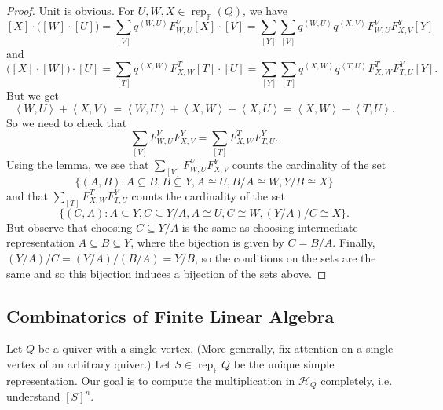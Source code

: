 \documentclass{book}
\DeclareMathOperator{\rep}{rep}
\begin{document}
    \begin{proof}
        Unit is obvious. For $U,W,X\in\rep_\mathbb{F}(Q)$, we have 
        \[[X]\cdot\Big([W]\cdot[U]\Big)=\sum_{[V]}q^{\left<W,U\right>}F_{W,U}^V[X]\cdot[V]=\sum_{[Y]}\sum_{[V]}q^{\left<W,U\right>}q^{\left<X,V\right>}F_{W,U}^VF_{X,V}^Y[Y]\]
        and
        \[ \Big([X]\cdot[W]\Big)\cdot[U] = \sum_{[T]}q^{\left<X,W\right>}F_{X,W}^T[T]\cdot[U] = \sum_{[Y]}\sum_{[T]}q^{\left<X,W\right>}q^{\left<T,U\right>}F_{X,W}^T F_{T,U}^Y[Y].\]
        But we get \[ \left<W,U\right>+\left<X,V\right> = \left<W,U\right>+\left<X,W\right>+\left<X,U\right> = \left<X,W\right>+\left<T,U\right>.\]
        So we need to check that \[\sum_{[V]}F_{W,U}^V F_{X,V}^Y=\sum_{[T]}F_{X,W}^T F_{T,U}^Y.\]
        Using the lemma, we see that $\sum_{[V]}F_{W,U}^V F_{X,V}^Y$ counts the cardinality of the set 
        \[\{(A,B): A\subseteq B, B\subseteq Y, A\cong U, B/A\cong W, Y/B\cong X\}\]
        and that $\sum_{[T]}F_{X,W}^T F_{T,U}^Y$ counts the cardinality of the set 
         \[\{(C,A): A\subseteq Y, C\subseteq Y/A, A\cong U, C\cong W, (Y/A)/C\cong X\}.\]
         But observe that choosing $C\subseteq Y/A$ is the same as choosing intermediate representation $A\subseteq B\subseteq Y$, where the bijection is given by $C=B/A$. Finally, $(Y/A)/C=(Y/A)/(B/A)=Y/B$, so the conditions on the sets are the same and so this bijection induces a bijection of the sets above.
    \end{proof}
    
    \subsection{Combinatorics of Finite Linear Algebra}
    Let $Q$ be a quiver with a single vertex. (More generally, fix attention on a single vertex of an arbitrary quiver.) Let $S\in \rep_{\mathbb{F}}Q$ be the unique simple representation. Our goal is to compute the multiplication in $\mathcal{H}_Q$ completely, i.e. understand $[S]^n$.
    
\end{document}

